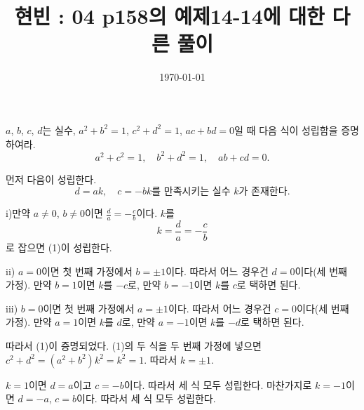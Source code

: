 \documentclass{article}
\begin{document}
\title{현빈 : 04 p158의 예제14-14에 대한 다른 풀이}
\author{}
\date{\today}
\maketitle

\noindent
\begin{mdframed}[frametitle={예제 14-14}]
\(a\), \(b\), \(c\), \(d\)는 실수, \(a^2+b^2=1\), \(c^2+d^2=1\), \(ac+bd=0\)일 때 다음 식이 성립함을 증명하여라.
\[a^2+c^2=1,\quad b^2+d^2=1,\quad ab+cd=0.\]
\end{mdframed}
먼저 다음이 성립한다.
\[d=ak,\quad c=-bk\text{를 만족시키는 실수 \(k\)가 존재한다.}\tag{1}\]

i)만약 \(a\neq0\), \(b\neq0\)이면 \(\frac da=-\frac cb\)이다.
\(k\)를
\[k=\frac da=-\frac cb\]
로 잡으면 (1)이 성립한다.

ii) \(a=0\)이면 첫 번째 가정에서 \(b=\pm1\)이다.
따라서 어느 경우건 \(d=0\)이다(세 번째 가정).
만약 \(b=1\)이면 \(k\)를 \(-c\)로, 만약 \(b=-1\)이면 \(k\)를 \(c\)로 택하면 된다.

iii) \(b=0\)이면 첫 번째 가정에서 \(a=\pm1\)이다.
따라서 어느 경우건 \(c=0\)이다(세 번째 가정).
만약 \(a=1\)이면 \(k\)를 \(d\)로, 만약 \(a=-1\)이면 \(k\)를 \(-d\)로 택하면 된다.

따라서 (1)이 증명되었다.
(1)의 두 식을 두 번째 가정에 넣으면
\(c^2+d^2=(a^2+b^2)k^2=k^2=1\).
따라서 \(k=\pm1\).

\(k=1\)이면 \(d=a\)이고 \(c=-b\)이다.
따라서 세 식 모두 성립한다.
마찬가지로 \(k=-1\)이면 \(d=-a\), \(c=b\)이다.
따라서 세 식 모두 성립한다.
\end{document}
